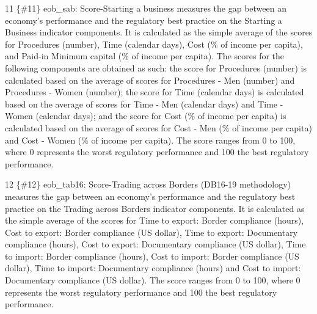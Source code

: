 \documentclass[
]{article}
\begin{document}
11 \{\#11\} eob\_sab: Score-Starting a business measures the gap between
an economy's performance and the regulatory best practice on the
Starting a Business indicator components. It is calculated as the simple
average of the scores for Procedures (number), Time (calendar days),
Cost (\% of income per capita), and Paid-in Minimum capital (\% of
income per capita). The scores for the following components are obtained
as such: the score for Procedures (number) is calculated based on the
average of scores for Procedures - Men (number) and Procedures - Women
(number); the score for Time (calendar days) is calculated based on the
average of scores for Time - Men (calendar days) and Time - Women
(calendar days); and the score for Cost (\% of income per capita) is
calculated based on the average of scores for Cost - Men (\% of income
per capita) and Cost - Women (\% of income per capita). The score ranges
from 0 to 100, where 0 represents the worst regulatory performance and
100 the best regulatory performance.

12 \{\#12\} eob\_tab16: Score-Trading across Borders (DB16-19
methodology) measures the gap between an economy's performance and the
regulatory best practice on the Trading across Borders indicator
components. It is calculated as the simple average of the scores for
Time to export: Border compliance (hours), Cost to export: Border
compliance (US dollar), Time to export: Documentary compliance (hours),
Cost to export: Documentary compliance (US dollar), Time to import:
Border compliance (hours), Cost to import: Border compliance (US
dollar), Time to import: Documentary compliance (hours) and Cost to
import: Documentary compliance (US dollar). The score ranges from 0 to
100, where 0 represents the worst regulatory performance and 100 the
best regulatory performance.
\end{document}
